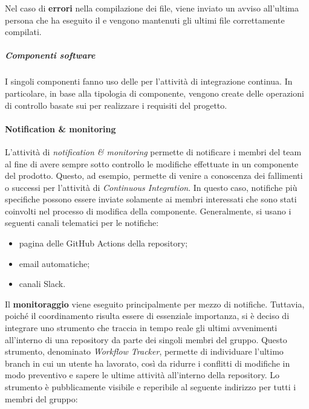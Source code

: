 		Nel caso di \textbf{errori} nella compilazione dei file, viene inviato un avviso all'ultima persona che ha eseguito il  e vengono mantenuti gli ultimi file correttamente compilati.

		\subparagraph{Componenti software}

		I singoli componenti fanno uso delle  per l'attività di integrazione continua. In particolare, in base alla tipologia di componente, vengono create delle operazioni di controllo basate sui  per realizzare i requisiti del progetto.
	

	\paragraph{Notification \& monitoring}

	L'attività di \textit{notification \& monitoring} permette di notificare i membri del team al fine di avere sempre sotto controllo le modifiche effettuate in un componente del prodotto. Questo, ad esempio, permette di venire a conoscenza dei fallimenti o successi per l'attività di \textit{Continuous Integration}. In questo caso, notifiche più specifiche possono essere inviate solamente ai membri interessati che sono stati coinvolti nel processo di modifica della componente. 
	\newline
	Generalmente, si usano i seguenti canali telematici per le notifiche:
	\begin{itemize}
		\item pagina delle GitHub Actions della repository;
		\item email automatiche;
		\item canali Slack.
	\end{itemize}

	Il \textbf{monitoraggio} viene eseguito principalmente per mezzo di notifiche. Tuttavia, poiché il coordinamento risulta essere di essenziale importanza, si è deciso di integrare uno strumento che traccia in tempo reale gli ultimi avvenimenti all'interno di una repository da parte dei singoli membri del gruppo.
	Questo strumento, denominato \textit{Workflow Tracker}, permette di individuare l'ultimo branch in cui un utente ha lavorato, così da ridurre i conflitti di modifiche in modo preventivo e sapere le ultime attività all'interno della repository.
	\newline
	Lo strumento è pubblicamente visibile e reperibile al seguente indirizzo per tutti i membri del gruppo:

